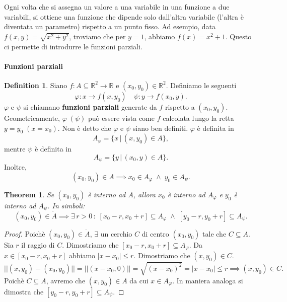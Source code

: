 \documentclass{article}
\theoremstyle{plain}
\newtheorem{thm}{Theorem}[section]
\theoremstyle{definition}
\newtheorem{defn}{Definition}[section]
\theoremstyle{remark}
\begin{document}
\vspace{10pt}

Ogni volta che si assegna un valore a una variabile in una funzione a due variabili, si ottiene una funzione che dipende solo dall'altra variabile (l'altra è diventata un parametro) rispetto a un punto fisso.
Ad esempio, data $f(x,y)=\sqrt{x^2+y^2}$, troviamo che per $y=1$, abbiamo $f(x)={x^2+1}$.
Questo ci permette di introdurre le funzioni parziali.

\vspace{10pt}

\paragraph{Funzioni parziali}
\begin{bxthm}
\begin{defn}\label{funzparz}
    Siano $f:A\subseteq\mathbb{R}^2\to\mathbb{R}$ e $(x_0,y_0)\in\mathbb{R}^2$.
    Definiamo le seguenti \[\varphi :x\to f(x,y_0)\quad\psi :y\to f(x_0,y).\]
    $\varphi$ e $\psi$ si chiamano \textbf{funzioni parziali} generate da $f$ rispetto a $(x_0,y_0)$.
    Geometricamente, $\varphi\;(\psi)$  può essere vista come $f$ calcolata lungo la retta $y=y_0\;(x=x_0)$.
    Non è detto che $\varphi$ e $\psi$ siano ben definiti.
    $\varphi$ è definita in \[A_\varphi=\{x\,|\,(x,y_0)\in A\},\] mentre $\psi$ è definita in \[A_\psi=\{y\,|\,(x_0,y)\in A\}.\]
    Inoltre, 
    \[(x_0,y_0)\in A\implies x_0\in A_\varphi\;\land\;y_0\in A_\psi.\]
\end{defn}
\end{bxthm}

\vspace{10pt}

\begin{bxthm}
\begin{thm}
    Se $(x_0,y_0)$ è interno ad $A$, allora $x_0$ è interno ad $A_\varphi$ e $y_0$ è interno ad $A_\psi$.
    In simboli:
    \[(x_0,y_0)\in\dot{A}\implies\exists\, r>0\,:\;[x_0-r,x_0+r]\subseteq A_\varphi\;\land\;[y_0-r,y_0+r]\subseteq A_\psi.\]
\end{thm}
\end{bxthm}
\begin{proof}
    Poichè $(x_0,y_0)\in\dot{A}$, $\exists$ un cerchio $C$ di centro $(x_0,y_0)$ tale che $C\subseteq A$. Sia $r$ il raggio di $C$.
    Dimostriamo che $[x_0-r,x_0+r]\subseteq A_\varphi$. 
    Da $x\in [x_0-r,x_0+r]$ abbiamo $|x-x_0|\leq r$.
    Dimostriamo che $(x,y_0)\in C$.
    \[|| (x,y_0)-(x_0,y_0) ||=|| (x-x_0,0) ||=\sqrt{(x-x_0)^2}=|x-x_0|\leq r\implies (x,y_0)\in C.\]
    Poichè $C\subseteq A$, avremo che $(x,y_0)\in A$ da cui $x\in A_\varphi$.
    In maniera analoga si dimostra che $[y_0-r,y_0+r]\subseteq A_\psi$.
\end{proof}
\end{document}
